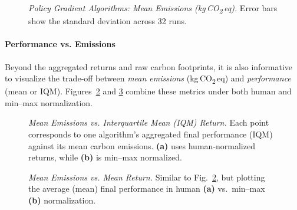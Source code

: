 \begin{figure} 
	\centering
	
	\caption{\emph{Policy Gradient Algorithms: Mean Emissions (kg\,CO\textsubscript{2}\,eq).} Error bars show the standard deviation across 32 runs.}
	\label{fig:policy_emissions_bar}
\end{figure}

\paragraph{Performance vs. Emissions}
Beyond the aggregated returns and raw carbon footprints, it is also informative to visualize the trade‐off between \emph{mean emissions} (kg\,CO\textsubscript{2}\,eq) and \emph{performance} (mean or IQM). Figures~\ref{fig:scatter_emissions_a} and \ref{fig:scatter_emissions_b} combine these metrics under both human and min–max normalization.

\begin{figure} 
	\centering
	\quad
	\caption{\emph{Mean Emissions vs. Interquartile Mean (IQM) Return.}
		Each point corresponds to one algorithm's aggregated final performance (IQM) against its mean carbon emissions. 
		\textbf{(a)} uses human‐normalized returns, while \textbf{(b)} is min--max normalized.}
	\label{fig:scatter_emissions_a}
\end{figure}

\begin{figure} 
	\centering
	\quad
	\caption{\emph{Mean Emissions vs. Mean Return.}
		Similar to Fig.~\ref{fig:scatter_emissions_a}, but plotting the average (mean) final performance in human \textbf{(a)} vs.\ min--max \textbf{(b)} normalization.}
	\label{fig:scatter_emissions_b}
\end{figure}

